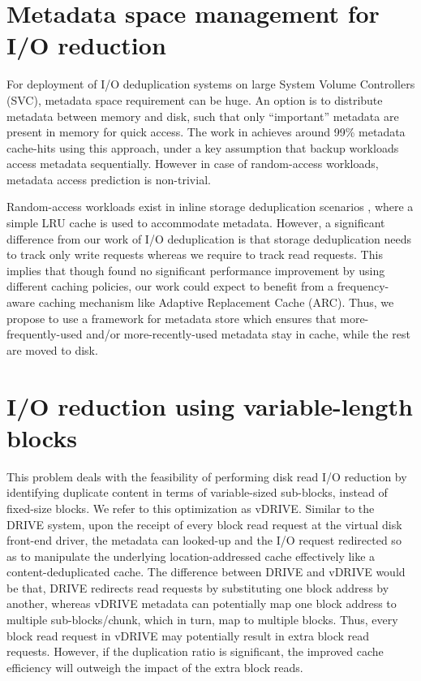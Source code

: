 \section{Metadata space management for I/O reduction}
For deployment of I/O deduplication systems
on large System Volume
Controllers (SVC), metadata space requirement can be huge.
An option is to distribute metadata between memory and disk, such that only
``important'' metadata are present in memory for quick
access. The work in \cite{data-domain} achieves around 99\%
metadata cache-hits using this approach, under a key assumption
that backup workloads access metadata sequentially.
However in case of random-access workloads,
metadata access prediction is non-trivial.

Random-access workloads exist in inline storage deduplication scenarios
\cite{idedup}, where a simple LRU cache is used to accommodate metadata.
However, a significant difference from our work
of I/O deduplication is that storage deduplication needs to track only
write requests whereas we require to track read requests.
This implies that though \cite{idedup} found no significant performance
improvement by using different caching policies, our work
could expect to benefit from a frequency-aware caching mechanism like
Adaptive Replacement Cache (ARC).
Thus, we propose to use a framework for metadata store which
ensures that more-frequently-used and/or more-recently-used
metadata stay in cache, while the rest are moved to disk.

\section{I/O reduction using variable-length blocks}
This problem deals with the feasibility of performing disk
read I/O reduction by identifying duplicate content in terms of
variable-sized sub-blocks, instead of fixed-size blocks.
We refer to this optimization as vDRIVE.
Similar to the DRIVE system, upon the receipt 
of every block read request at the virtual disk front-end driver, 
the metadata can looked-up and the I/O
request redirected so as to manipulate the underlying 
location-addressed cache effectively like a content-deduplicated cache. 
The difference between DRIVE and vDRIVE would be that, DRIVE
redirects read requests by substituting one block address by 
another, whereas vDRIVE metadata can potentially map one block
address to multiple sub-blocks/chunk, which in turn, map to multiple blocks.
Thus, every block read request in vDRIVE may potentially result
in extra block read requests. However, if the duplication ratio
is significant, the improved cache efficiency will outweigh the
impact of the extra block reads.

